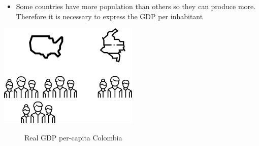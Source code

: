 \documentclass[
  ignorenonframetext,
]{beamer}
\providecommand{\tightlist}{%
  \setlength{\itemsep}{0pt}\setlength{\parskip}{0pt}}\usepackage{longtable,booktabs,array}
\begin{document}
\begin{frame}{}
\label{section-12}
\begin{itemize}
\tightlist
\item
  Some countries have more population than others so they can produce
  more. Therefore it is necessary to express the GDP per inhabitant
\end{itemize}

\begin{center}
\includegraphics[width=0.5\textwidth,height=\textheight]{_000_images/002_image2.png}
\end{center}
\end{frame}

\begin{frame}{}
\label{section-13}
\begin{figure}


\caption{\label{fig-real-gdp-pc-col}Real GDP per-capita Colombia}

\end{figure}%
\end{frame}
\end{document}
